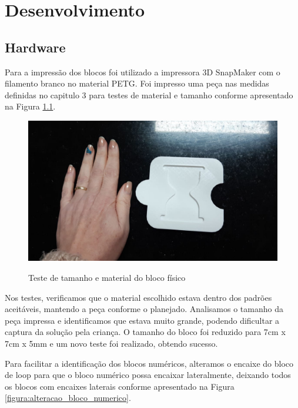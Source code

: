 \chapter{Desenvolvimento} \label{cap:desenvolvimento}

\section{Hardware}

    Para a impressão dos blocos foi utilizado a impressora 3D SnapMaker com o filamento branco no material PETG. Foi impresso uma peça nas medidas definidas no capitulo 3 para testes de material e tamanho conforme apresentado na Figura \ref{figura:teste_bloco}.
    
    \begin{figure}[H]
        \caption{Teste de tamanho e material do bloco físico}
        \centering
        \includegraphics[width=\linewidth]{Imagens/Cap4/teste_bloco.jpeg}
        \label{figura:teste_bloco}
    \end{figure}
    
    Nos testes, verificamos que o material escolhido estava dentro dos padrões aceitáveis, mantendo a peça conforme o planejado. Analisamos o tamanho da peça impressa e identificamos que estava muito grande, podendo dificultar a captura da solução pela criança. O tamanho do bloco foi reduzido para 7cm x 7cm x 5mm e um novo teste foi realizado, obtendo sucesso.
    
    Para facilitar a identificação dos blocos numéricos, alteramos o encaixe  do bloco de loop para que o bloco numérico possa encaixar lateralmente, deixando todos os blocos com encaixes laterais conforme apresentado na Figura \ref{figura:alteracao_bloco_numerico}.
    
